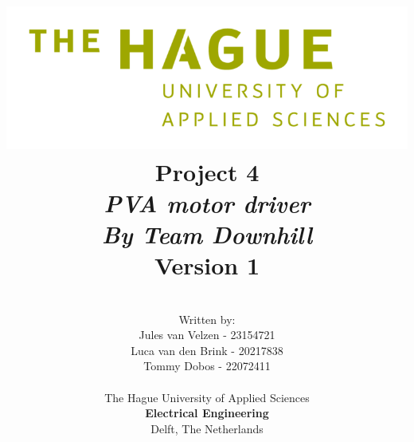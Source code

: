 \title{
\includegraphics[width=7in]{IMG/hhs_en_groen_hex1.png} \\
\vspace*{1.5in}
\textbf{Project 4}\\
\textit{\huge PVA motor driver\\
\normalsize By Team Downhill}\\
Version 1
}
\author{
\vspace*{1.0in} \\
  Written by:\\
  Jules van Velzen - 23154721\\
  Luca van den Brink - 20217838\\
  Tommy Dobos - 22072411\\
		\vspace*{0.5in} \\
		The Hague University of Applied Sciences\\
        \textbf{Electrical Engineering}\\
        Delft, The Netherlands
       } 